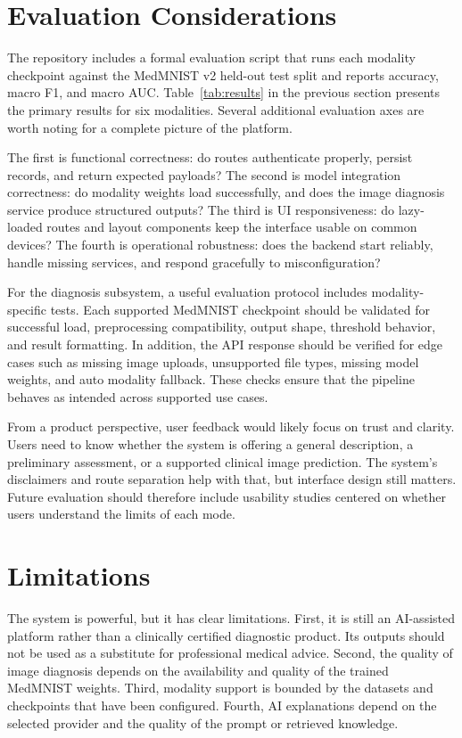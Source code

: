 \documentclass[conference]{IEEEtran}
\begin{document}
\section{Evaluation Considerations}
The repository includes a formal evaluation script that runs each modality checkpoint against the MedMNIST v2 held-out test split and reports accuracy, macro F1, and macro AUC. Table~\ref{tab:results} in the previous section presents the primary results for six modalities. Several additional evaluation axes are worth noting for a complete picture of the platform.

The first is functional correctness: do routes authenticate properly, persist records, and return expected payloads? The second is model integration correctness: do modality weights load successfully, and does the image diagnosis service produce structured outputs? The third is UI responsiveness: do lazy-loaded routes and layout components keep the interface usable on common devices? The fourth is operational robustness: does the backend start reliably, handle missing services, and respond gracefully to misconfiguration?

For the diagnosis subsystem, a useful evaluation protocol includes modality-specific tests. Each supported MedMNIST checkpoint should be validated for successful load, preprocessing compatibility, output shape, threshold behavior, and result formatting. In addition, the API response should be verified for edge cases such as missing image uploads, unsupported file types, missing model weights, and auto modality fallback. These checks ensure that the pipeline behaves as intended across supported use cases.

From a product perspective, user feedback would likely focus on trust and clarity. Users need to know whether the system is offering a general description, a preliminary assessment, or a supported clinical image prediction. The system’s disclaimers and route separation help with that, but interface design still matters. Future evaluation should therefore include usability studies centered on whether users understand the limits of each mode.

\section{Limitations}
The system is powerful, but it has clear limitations. First, it is still an AI-assisted platform rather than a clinically certified diagnostic product. Its outputs should not be used as a substitute for professional medical advice. Second, the quality of image diagnosis depends on the availability and quality of the trained MedMNIST weights. Third, modality support is bounded by the datasets and checkpoints that have been configured. Fourth, AI explanations depend on the selected provider and the quality of the prompt or retrieved knowledge.
\end{document}
